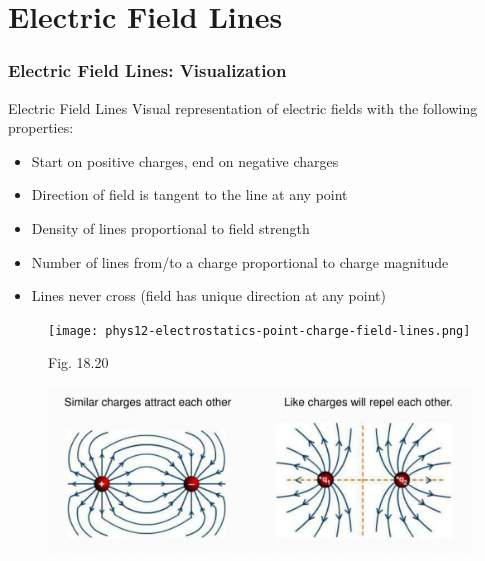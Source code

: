 \documentclass{beamer}
\newcommand{\highlight}[1]{\textcolor{ds9red}{#1}}
\begin{document}
\section{Electric Field Lines}

\begin{frame}
    \frametitle{Electric Field Lines: Visualization}
    
    \begin{block}{Electric Field Lines}
        Visual representation of electric fields with the following properties:
    \end{block}
    
    \begin{itemize}
        \item Start on \highlight{positive} charges, end on \highlight{negative} charges
        \item Direction of field is \highlight{tangent} to the line at any point
        \item Density of lines proportional to field \highlight{strength}
        \item Number of lines from/to a charge proportional to charge \highlight{magnitude}
        \item Lines \highlight{never cross} (field has unique direction at any point)
    \end{itemize}
    
    \begin{figure}
        \centering
        \texttt{[image: phys12-electrostatics-point-charge-field-lines.png]}
        \caption{Fig. 18.20}
    \end{figure}
\end{frame}

\begin{frame}
\begin{figure}
            \centering
\includegraphics[width=1\linewidth]{phys12-electrostatics-field-lines-repulsion.png}
            \vspace{0.5cm}
          
        \end{figure}
\end{frame}
\end{document}

